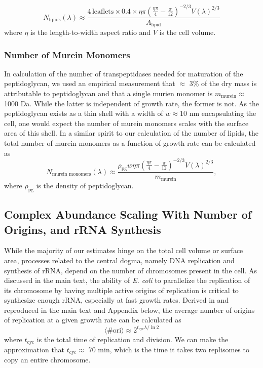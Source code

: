 \begin{equation}
    N_\text{lipids}(\lambda) \approx \frac{4\,\text{leaflets} \times 0.4 \times
    \eta\pi\left(\frac{\eta\pi}{4} -
    \frac{\pi}{12}\right)^{-2/3}V(\lambda)^{2/3}}{A_\text{lipid}}
\end{equation}
where $\eta$ is the length-to-width aspect ratio and $V$ is the cell volume.

\subsubsection{Number of Murein Monomers}
In calculation of the number of transpeptidases needed for maturation of the
peptidoglycan, we used an empirical measurement that $\approx$ 3\% of the dry
mass is attributable to peptidoglycan and that a single murien monomer is
$m_\text{murein} \approx$ 1000 Da. While the latter is independent of growth rate, the former is
not. As the peptidoglycan exists as a thin shell with a width of $w \approx 10$
nm encapsulating the cell, one would expect the number of murein monomers scales
with the surface area of this shell. In a similar spirit to our calculation of
the number of lipids, the total number of murein monomers as a function of
growth rate can be calculated as
\begin{equation}
N_\text{murein monomers}(\lambda) \approx \frac{\rho_\text{pg} w \eta\pi\left(\frac{\eta\pi}{4} -
    \frac{\pi}{12}\right)^{-2/3}V(\lambda)^{2/3}}{m_\text{murein}},
\end{equation}
where $\rho_\text{pg}$ is the density of peptidoglycan.


\subsection{Complex Abundance Scaling With Number of Origins, and rRNA Synthesis}
While the majority of our estimates hinge on the total cell volume or surface
area, processes related to the central dogma, namely DNA replication and
synthesis of rRNA, depend on the number of chromosomes present in the cell. As
discussed in the main text, the ability of \textit{E. coli} to parallelize the
replication of its chromosome by having multiple active origins of replication
is critical to synthesize enough rRNA, especially at fast growth
rates. Derived in \cite{si2017} and reproduced in the main text and Appendix  below, the average number of
origins of replication at a given growth rate can be calculated as
\begin{equation}
\langle\# \text{ori} \rangle \approx 2^{t_\text{cyc} \lambda / \ln 2}
\label{eq:nori}
\end{equation}
where $t_\text{cyc}$ is the total time of replication and division. We can make
the approximation that $t_\text{cyc} \approx$ 70 min, which is the  time it
takes two replisomes to copy an entire chromosome.

